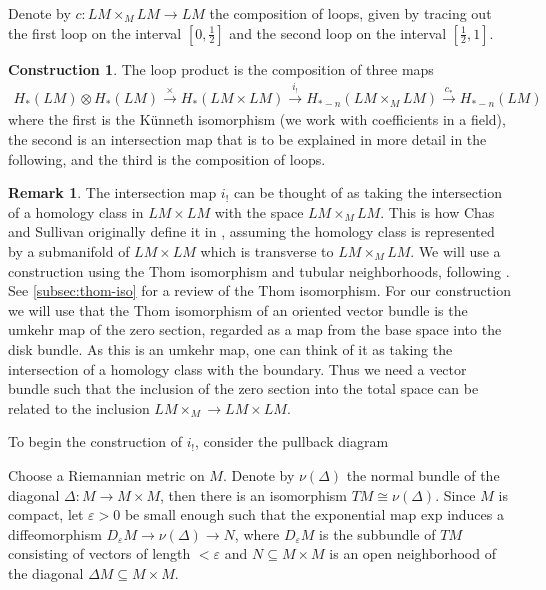 \documentclass{scrartcl}
\theoremstyle{plain}
\theoremstyle{definition}
\newtheorem{remark}[theorem]{Remark}
\newtheorem{construction}[theorem]{Construction}
\renewcommand{\epsilon}{\varepsilon}
\renewcommand{\subset}{\subseteq}
\newcommand{\iso}{\cong}
\let\xto\xrightarrow
\begin{document}
Denote by $c\colon LM\times_M LM\to LM$ the composition of loops, given by tracing out the first loop on the interval $[0, \frac 12]$ and the second loop on the interval $[\frac 12, 1]$.

\begin{construction}\label{constr:loop-product-classical}
The loop product is the composition of three maps
\begin{align*}
    H_*(LM)\otimes H_*(LM)\xto{\times} H_{*}(LM\times LM)\xto{i_!} H_{*-n}(LM\times_M LM)\xto{c_*} H_{*-n}(LM)
\end{align*}
where the first is the Künneth isomorphism (we work with coefficients in a field), the second is an intersection map that is to be explained in more detail in the following, and the third is the composition of loops. 
\end{construction}

\begin{remark}
The intersection map $i_!$ can be thought of as taking the intersection of a homology class in $LM\times LM$ with the space $LM\times_M LM$. This is how Chas and Sullivan originally define it in \cite{chas1999string}, assuming the homology class is represented by a submanifold of $LM\times LM$ which is transverse to $LM\times_M LM$. 
We will use a construction using the Thom isomorphism and tubular neighborhoods, following \cite{cohen2002homotopy}. See \cref{subsec:thom-iso} for a review of the Thom isomorphism. For our construction we will use that the Thom isomorphism of an oriented vector bundle is the umkehr map of the zero section, regarded as a map from the base space into the disk bundle. As this is an umkehr map, one can think of it as taking the intersection of a homology class with the boundary. Thus we need a vector bundle such that the inclusion of the zero section into the total space can be related to the inclusion $LM\times_M \to LM\times LM$. 
\end{remark}

To begin the construction of $i_!$, consider the pullback diagram
\begin{center}
\end{center}

Choose a Riemannian metric on $M$. Denote by $\nu(\Delta)$ the normal bundle of the diagonal $\Delta\colon M\to M\times M$, then there is an isomorphism $TM\iso \nu(\Delta)$. Since $M$ is compact, let $\epsilon>0$ be small enough such that the exponential map $\mathrm{exp}$ induces a diffeomorphism $D_\epsilon M\to \nu(\Delta)\to N$, where $D_\epsilon M$ is the subbundle of $TM$ consisting of vectors of length $<\epsilon$ and $N\subset M\times M$ is an open neighborhood of the diagonal $\Delta M\subset M\times M$. 
\end{document}
